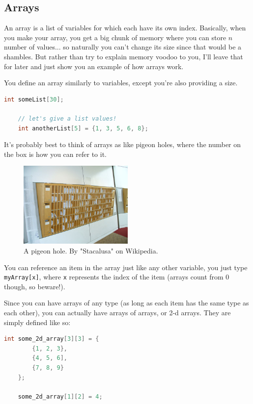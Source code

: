 \subsection{Arrays}
An array is a list of variables for which each have its own index. Basically, when you make your array, you get a big chunk of memory where you can store $n$ number of values... so naturally you can't change its size since that would be a shambles. But rather than try to explain memory voodoo to you, I'll leave that for later and just show you an example of how arrays work.

You define an array similarly to variables, except you're also providing a size.
\begin{lstlisting}[language=C]
    int someList[30];

    // let's give a list values!
    int anotherList[5] = {1, 3, 5, 6, 8};
\end{lstlisting}

It's probably best to think of arrays as like pigeon holes, where the number on the box is how you can refer to it.

\begin{figure}[h]
    \centering
    \includegraphics[width=0.5\textwidth]{pigeonhole}
    \caption{A pigeon hole. By "Stacalusa" on Wikipedia.}
\end{figure}

You can reference an item in the array just like any other variable, you just type \texttt{myArray[x]}, where \texttt{x} represents the index of the item (arrays count from 0 though, so beware!).

Since you can have arrays of any type (as long as each item has the same type as each other), you can actually have arrays of arrays, or 2-d arrays. They are simply defined like so:
\begin{lstlisting}[language=C]
    int some_2d_array[3][3] = {
        {1, 2, 3},
        {4, 5, 6],
        {7, 8, 9}
    };

    some_2d_array[1][2] = 4;
\end{lstlisting}

